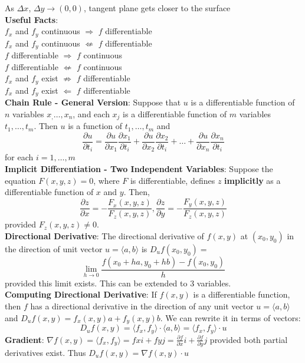 \documentclass{article}
\begin{document}
\begin{multicols*}{3}
As $\Delta x$, $\Delta y\to (0,0)$, tangent plane gets closer to the surface \\
\textbf{Useful Facts}: \\
$f_x$ and $f_y$ continuous $\Rightarrow$ $f$ differentiable \\
$f_x$ and $f_y$ continuous $\not\Leftarrow$ $f$ differentiable \\
$f$ differentiable $\Rightarrow$ $f$ continuous \\
$f$ differentiable $\not\Leftarrow$ $f$ continuous \\
$f_x$ and $f_y$ exist $\not\Rightarrow$ $f$ differentiable \\
$f_x$ and $f_y$ exist $\Leftarrow$ $f$ differentiable \\
\textbf{Chain Rule - General Version}: Suppose that $u$ is a differentiable function of $n$ variables $x_,\dots , x_n$, and each $x_j$ is a differentiable function of $m$ variables $t_1,\dots,t_m$. Then $u$ is a function of $t_1,\dots,t_m$ and $$\frac{\partial u}{\partial t_i}=\frac{\partial u}{\partial x_1}\frac{\partial x_1}{\partial t_i}+\frac{\partial u}{\partial x_2}\frac{\partial x_2}{\partial t_i}+\dots+\frac{\partial u}{\partial x_n}\frac{\partial x_n}{\partial t_i}$$ for each $i=1,\dots,m$ \\
\textbf{Implicit Differentiation - Two Independent Variables}: Suppose the equation $F(x,y,z) = 0$, where $F$ is differentiable, defines $z$ \textbf{implicitly} as a differentiable function of $x$ and $y$. Then, $$\frac{\partial z}{\partial x}=-\frac{F_x(x,y,z)}{F_z(x,y,z)},\frac{\partial z}{\partial y}=-\frac{F_y(x,y,z)}{F_z(x,y,z)}$$ provided $F_z(x,y,z)\not=0$. \\
\textbf{Directional Derivative}: The directional derivative of $f(x,y)$ at $(x_0,y_0)$ in the direction of unit vector $u = \langle a, b\rangle $ is $D_uf(x_0,y_0)=$ $$\lim_{h\to 0}\frac{f(x_0+ha,y_0+hb)-f(x_0,y_0)}{h}$$ provided this limit exists. This can be extended to 3 variables. \\
\textbf{Computing Directional Derivative}: If $f(x,y)$ is a differentiable function, then $f$ has a directional derivative in the direction of any unit vector $u = \langle a, b\rangle$ and
$D_uf(x,y) = f_x(x,y)a + f_y(x,y)b$. We can rewrite it in terms of vectors:
$$D_uf(x,y) = \langle f_x,f_y\rangle \cdot \langle a,b\rangle = \langle f_x,f_y\rangle \cdot u$$
\textbf{Gradient}: $\nabla f(x,y)=\langle f_x,f_y\rangle =fxi+fyj= \frac{\partial f}{\partial x}i + \frac{\partial f}{\partial y}j$
provided both partial derivatives exist. Thus $D_uf(x,y)=\nabla f(x,y)\cdot u$ 

\end{multicols*}
\end{document}
